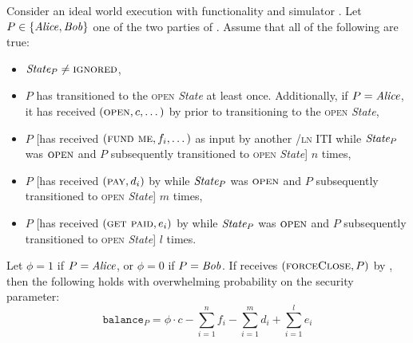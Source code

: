 \begin{lemma}
\label{lemma:ideal-balance}
  Consider an ideal world execution with functionality \fchan and simulator
  \simulator. Let $P \in \{\mathit{Alice}, \mathit{Bob}\}$ one of the two parties of \fchan.
  Assume that all of the following are true:
  \begin{itemize}
    \item $\itistate_P \neq \textsc{ignored}$,
    \item $P$ has transitioned to the \textsc{open} \textit{State} at least
    once. Additionally, if $P = \mathit{Alice}$, it has received $(\textsc{open}, c,
    \dots)$ by \environment prior to transitioning to the \textsc{open}
    \textit{State},
    \item $P$ [has received $(\textsc{fund me}, f_i, \dots)$ as input by another
    \fchan/\textsc{ln} ITI while $\itistate_P$ was $\textsc{open}$ and $P$
    subsequently transitioned to \textsc{open} \textit{State}] $n$ times,
    \item $P$ [has received $(\textsc{pay}, d_i)$ by \environment while
    $\itistate_P$ was $\textsc{open}$ and $P$ subsequently transitioned to
    \textsc{open} \textit{State}] $m$ times,
    \item $P$ [has received $(\textsc{get paid}, e_i)$ by \environment while
    $\itistate_P$ was $\textsc{open}$ and $P$ subsequently transitioned to
    \textsc{open} \textit{State}] $l$ times.
  \end{itemize}
  Let $\phi = 1$ if $P = \mathit{Alice}$, or $\phi = 0$ if $P = \mathit{Bob}$. If \fchan
  receives $(\textsc{forceClose}, P)$ by \simulator, then the following holds with
  overwhelming probability on the security parameter:
  \begin{equation}
    \texttt{balance}_P = \phi \cdot c - \sum\limits_{i=1}^n f_i -
    \sum\limits_{i=1}^m d_i + \sum\limits_{i=1}^l e_i
  \end{equation}
\end{lemma}

